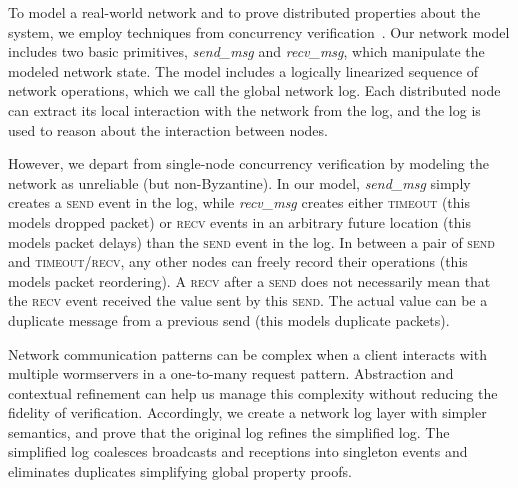 To model a real-world network and to prove distributed properties about the system, we employ techniques from concurrency verification~\cite{concurrency}. Our network model includes two basic primitives, \textit{send\_msg} and \textit{recv\_msg}, which manipulate the modeled network state. The model includes a logically linearized sequence of network operations, which we call the global network log. Each distributed node can extract its local interaction with the network from the log, and the log is used to reason about the interaction between nodes.


However, we depart from single-node concurrency verification by modeling the network as unreliable (but non-Byzantine). In our model, \textit{send\_msg} simply creates a \textsc{send} event in the log, while \textit{recv\_msg} creates either \textsc{timeout} (this models dropped packet) or \textsc{recv} events in an arbitrary future location (this models packet delays) than the \textsc{send} event in the log. In between a pair of \textsc{send} and \textsc{timeout/recv}, any other nodes can freely record their operations (this models packet reordering). A \textsc{recv} after a \textsc{send} does not necessarily mean that the \textsc{recv} event received the value sent by this \textsc{send}. The actual value can be a duplicate message from a previous send (this models duplicate packets).




Network communication patterns can be complex when a client interacts with multiple wormservers in a one-to-many request pattern.
Abstraction and contextual refinement can help us manage this complexity without reducing the fidelity of verification.
Accordingly, we create a network log layer with simpler semantics, and prove that the original log refines the simplified log.
The simplified log coalesces broadcasts and receptions into singleton events and eliminates duplicates simplifying global property proofs.



